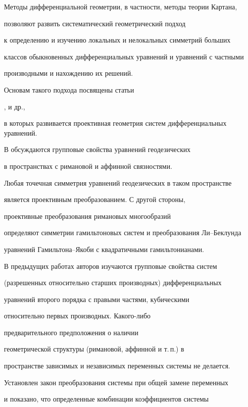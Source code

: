 Методы дифференциальной геометрии, в частности, методы теории Картана,


позволяют развить систематический геометрический подход


к определению и изучению локальных и нелокальных симметрий больших


классов обыкновенных дифференциальных уравнений и уравнений с частными


производными и нахождению их решений.





Основам такого подхода посвящены статьи 


\cite{Amin_Mat_Sb_95}, \cite{Am_Am_04} и др.,


в которых развивается проективная геометрия систем дифференциальных уравнений.


В \cite{Amin_Mat_Sb_95} обсуждаются групповые свойства уравнений геодезических


в пространствах с римановой и аффинной связностями.


Любая точечная симметрия уравнений геодезических в таком пространстве


является проективным преобразованием. С другой стороны,


проективные преобразования римановых многообразий


определяют симметрии гамильтоновых систем и преобразования Ли--Беклунда


уравнений Гамильтона--Якоби с квадратичными гамильтонианами.





В предыдущих работах авторов изучаются групповые свойства систем


(разрешенных относительно старших производных) дифференциальных


уравнений второго порядка с правыми частями, кубическими


относительно первых производных. Какого-либо


предварительного предположения о наличии


геометрической структуры (римановой, аффинной и т.\,п.) в


пространстве зависимых и независимых переменных системы не делается.


Установлен закон преобразования системы при общей замене переменных


и показано, что определенные комбинации коэффициентов системы


